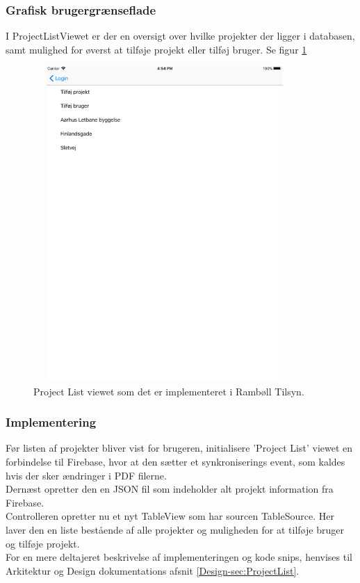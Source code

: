 \subsubsection{Grafisk brugergrænseflade}
I ProjectListViewet er der en oversigt over hvilke projekter der ligger i databasen, samt mulighed for øverst at tilføje projekt eller tilføj bruger. Se figur \ref{fig:ProjectListView}
\begin{figure}[H] %
	\centering
	\includegraphics[height=12cm, width=10cm]{Design/Applikation/ProjektList/ProjectList}
	\caption{Project List viewet som det er implementeret i Rambøll Tilsyn.}
	\label{fig:ProjectListView}
\end{figure}

\subsubsection{Implementering}
Før listen af projekter bliver vist for brugeren, initialisere 'Project List' viewet en forbindelse til Firebase, hvor at den sætter et synkroniserings event, som kaldes hvis der sker ændringer i PDF filerne. \\
Dernæst opretter den en JSON fil som indeholder alt projekt information fra Firebase. \\
Controlleren opretter nu et nyt TableView som har sourcen TableSource. Her laver den en liste bestående af alle projekter og muligheden for at tilføje bruger og tilføje projekt. \\
For en mere deltajeret beskrivelse af implementeringen og kode snips, henvises til Arkitektur og Design dokumentations afsnit \ref{Design-sec:ProjectList}.

\clearpage